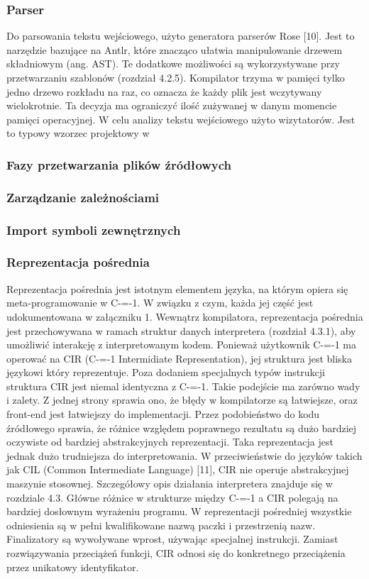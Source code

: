 \subsubsection{Parser}
Do parsowania tekstu wejściowego, użyto generatora parserów Rose [10]. Jest to narzędzie bazujące na Antlr, które znacząco ułatwia manipulowanie drzewem składniowym (ang. AST). Te dodatkowe możliwości są wykorzystywane przy przetwarzaniu szablonów (rozdział 4.2.5).
Kompilator trzyma w pamięci tylko jedno drzewo rozkładu na raz, co oznacza że każdy plik jest wczytywany wielokrotnie. Ta decyzja ma ograniczyć ilość zużywanej w danym momencie pamięci operacyjnej.
W celu analizy tekstu wejściowego użyto wizytatorów. Jest to typowy wzorzec projektowy w 
\subsubsection{Fazy przetwarzania plików źródłowych}

\subsubsection{Zarządzanie zależnościami}

\subsubsection{Import symboli zewnętrznych}

\subsubsection{Reprezentacja pośrednia}
Reprezentacja pośrednia jest istotnym elementem języka, na którym opiera się meta-programowanie w C-=-1. W związku z czym, każda jej część jest udokumentowana w załączniku 1. Wewnątrz kompilatora, reprezentacja pośrednia jest przechowywana w ramach struktur danych interpretera (rozdział 4.3.1), aby umożliwić interakcję z interpretowanym kodem.
Ponieważ użytkownik C-=-1 ma operować na CIR (C-=-1 Intermidiate Representation), jej struktura jest bliska językowi który reprezentuje. Poza dodaniem specjalnych typów instrukcji struktura CIR jest niemal identyczna z C-=-1. Takie podejście ma zarówno wady i zalety. 
Z jednej strony sprawia ono, że błędy w kompilatorze są łatwiejsze, oraz front-end jest łatwiejszy do implementacji. Przez podobieństwo do kodu źródłowego sprawia, że różnice względem poprawnego rezultatu są dużo bardziej oczywiste od bardziej abstrakcyjnych reprezentacji.
Taka reprezentacja jest jednak dużo trudniejsza do interpretowania. W przeciwieństwie do języków takich jak CIL (Common Intermediate Language) [11], CIR nie operuje abstrakcyjnej maszynie stosownej. Szczegółowy opis działania interpretera znajduje się w rozdziale 4.3.
Główne różnice w strukturze między C-=-1 a CIR polegają na bardziej dosłownym wyrażeniu programu. W reprezentacji pośredniej wszystkie odniesienia są w pełni kwalifikowane nazwą paczki i przestrzenią nazw. Finalizatory są wywoływane wprost, używając specjalnej instrukcji. Zamiast rozwiązywania przeciążeń funkcji, CIR odnosi się do konkretnego przeciążenia przez unikatowy identyfikator.
